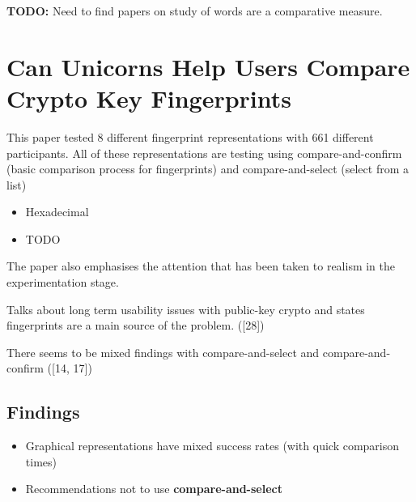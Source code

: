\textbf{TODO:} Need to find papers on study of words are a comparative measure.


\section{Can Unicorns Help Users Compare Crypto Key Fingerprints}

This paper tested 8 different fingerprint representations with 661 different participants. All of these representations are testing using compare-and-confirm (basic comparison process for fingerprints) and compare-and-select (select from a list)

\begin{itemize}
    \item Hexadecimal
    \item TODO
\end{itemize}

The paper also emphasises the attention that has been taken to realism in the experimentation stage.

Talks about long term usability issues with public-key crypto and states fingerprints are a main source of the problem. ([28])

There seems to be mixed findings with compare-and-select and compare-and-confirm ([14, 17])

\subsection{Findings}

\begin{itemize}
    \item Graphical representations have mixed success rates (with quick comparison times)
    \item Recommendations not to use \textbf{compare-and-select}
\end{itemize}